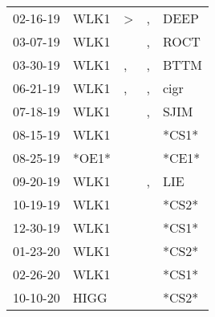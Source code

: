 \begin{supertabular}{p{0.07\textwidth}p{0.06\textwidth}p{0.02\textwidth}p{0.02\textwidth}p{0.06\textwidth}}
          02-16-19\textsuperscript{} &  WLK1\textsuperscript{} &     \textgreater &             , &           DEEP\textsuperscript{} \\
          03-07-19\textsuperscript{} &  WLK1\textsuperscript{} &                  &             , &           ROCT\textsuperscript{} \\
          03-30-19\textsuperscript{} &  WLK1\textsuperscript{} &                , &             , &           BTTM\textsuperscript{} \\
          06-21-19\textsuperscript{} &  WLK1\textsuperscript{} &                , &             , &           cigr\textsuperscript{} \\
          07-18-19\textsuperscript{} &  WLK1\textsuperscript{} &                  &             , &           SJIM\textsuperscript{} \\
          08-15-19\textsuperscript{} &  WLK1\textsuperscript{} &                  &               &                            *CS1* \\
          08-25-19\textsuperscript{} &                   *OE1* &                  &               &                            *CE1* \\
          09-20-19\textsuperscript{} &  WLK1\textsuperscript{} &                  &             , &            LIE\textsuperscript{} \\
          10-19-19\textsuperscript{} &  WLK1\textsuperscript{} &                  &               &                            *CS2* \\
          12-30-19\textsuperscript{} &  WLK1\textsuperscript{} &                  &               &                            *CS1* \\
          01-23-20\textsuperscript{} &  WLK1\textsuperscript{} &                  &               &                            *CS2* \\
          02-26-20\textsuperscript{} &  WLK1\textsuperscript{} &                  &               &                            *CS1* \\
          10-10-20\textsuperscript{} &  HIGG\textsuperscript{} &                  &               &                            *CS2* \\
\end{supertabular}
